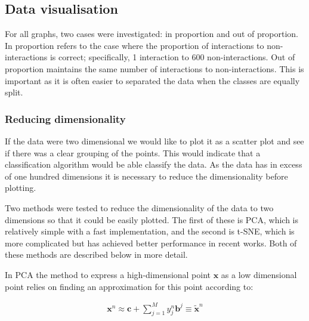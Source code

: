 

\subsection{Data visualisation}

For all graphs, two cases were investigated: in proportion and out of proportion.
In proportion refers to the case where the proportion of interactions to non-interactions is correct; specifically, 1 interaction to 600 non-interactions.
Out of proportion maintains the same number of interactions to non-interactions.
This is important as it is often easier to separated the data when the classes are equally split.

\subsubsection{Reducing dimensionality}
If the data were two dimensional we would like to plot it as a scatter plot and see if there was a clear grouping of the points.
This would indicate that a classification algorithm would be able classify the data.
As the data has in excess of one hundred dimensions it is necessary to reduce the dimensionality before plotting.

Two methods were tested to reduce the dimensionality of the data to two dimensions so that it could be easily plotted.
The first of these is PCA, which is relatively simple with a fast implementation, and the second is t-SNE, which is more complicated but has achieved better performance in recent works.
Both of these methods are described below in more detail.

In PCA the method to express a high-dimensional point $\pmb{x}$ as a low dimensional point relies on finding an approximation for this point according to\autocite[330]{barber_bayesian_2013}:

\begin{align}
    \pmb{x}^{n} \approx \pmb{c} + \sum_{j=1}^{M} y_{j}^{n} \pmb{b}^{j} \equiv \tilde{\pmb{x}}^{n}
\end{align}

